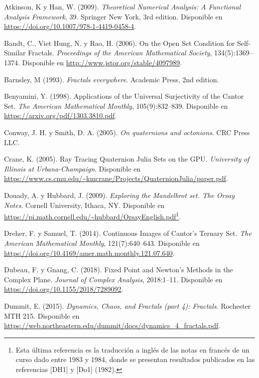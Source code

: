 \begin{thebibliography}{99}

     Atkinson, K y Han, W. (2009). \textit{Theoretical Numerical Analysis: A Functional Analysis Framework}, 39. Springer New York, 3rd edition. Disponible en \url{https://doi.org/10.1007/978-1-4419-0458-4}.

     Bandt, C., Viet Hung, N. y Rao, H. (2006). On the Open Set Condition for Self-Similar Fractals. \textit{Proceedings of the American Mathematical Society}, 134(5):1369--1374. Disponible en \url{http://www.jstor.org/stable/4097989}.

     Barnsley, M (1993). \textit{Fractals everywhere}. Academic Press, 2nd edition.

     Benyamini, Y. (1998). Applications of the Universal Surjectivity of the Cantor Set. \textit{The American Mathematical Monthly}, 105(9):832--839. Disponible en \url{https://arxiv.org/pdf/1303.3810.pdf}.

     Conway, J. H. y Smith, D. A. (2005). \textit{On quaternions and octonions}. CRC Press LLC.

     Crane, K. (2005). Ray Tracing Quaternion Julia Sets on the GPU. \textit{University of Illinois at Urbana-Champaign}. Disponible en \url{https://www.cs.cmu.edu/~kmcrane/Projects/QuaternionJulia/paper.pdf}.

     Douady, A. y Hubbard, J. (2009). \textit{Exploring the Mandelbrot set. The Orsay Notes}. Cornell University, Ithaca, NY. Disponible en \url{https://pi.math.cornell.edu/~hubbard/OrsayEnglish.pdf}\footnote{Esta última referencia es la traducción a inglés de las notas en francés de un curso dado entre 1983 y 1984, donde se presentan resultados publicados en las referencias [DH1] y [Do1] (1982).}.

     Dreher, F. y Samuel, T. (2014). Continuous Images of Cantor’s Ternary Set. \textit{The American Mathematical Monthly}, 121(7):640--643. Disponible en \url{https://doi.org/10.4169/amer.math.monthly.121.07.640}.

     Dubeau, F. y Gnang, C. (2018). Fixed Point and Newton’s Methods in the Complex Plane. \textit{Journal of Complex Analysis}, 2018:1--11. Disponible en \url{https://doi.org/10.1155/2018/7289092}.

     Dummit, E. (2015). \textit{Dynamics, Chaos, and Fractals (part 4): Fractals}. Rochester MTH 215. Disponible en \url{https://web.northeastern.edu/dummit/docs/dynamics_4_fractals.pdf}.


\end{thebibliography}
